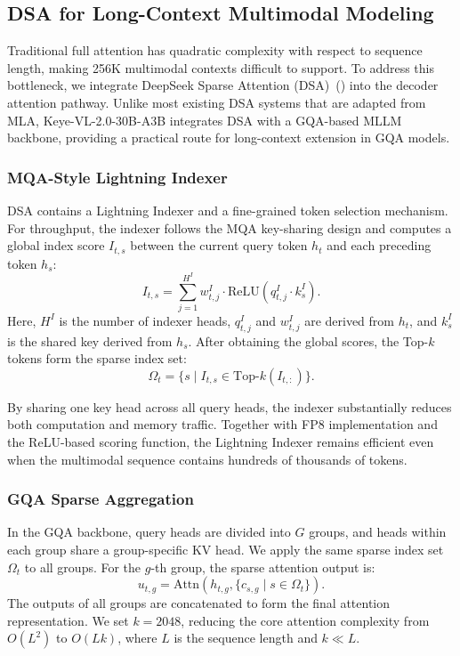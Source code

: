 \documentclass{article} %
\begin{document}
\subsection{DSA for Long-Context Multimodal Modeling}

Traditional full attention has quadratic complexity with respect to sequence length, making 256K multimodal contexts difficult to support. To address this bottleneck, we integrate DeepSeek Sparse Attention (DSA)~(\cite{deepseek2025v32}) into the decoder attention pathway. Unlike most existing DSA systems that are adapted from MLA, Keye-VL-2.0-30B-A3B integrates DSA with a GQA-based MLLM backbone, providing a practical route for long-context extension in GQA models.

\subsubsection{MQA-Style Lightning Indexer}

DSA contains a Lightning Indexer and a fine-grained token selection mechanism. For throughput, the indexer follows the MQA key-sharing design and computes a global index score $I_{t,s}$ between the current query token $h_t$ and each preceding token $h_s$:
\begin{equation}
    I_{t,s} = \sum_{j=1}^{H^{I}} w_{t,j}^{I} \cdot \mathrm{ReLU}(q_{t,j}^{I} \cdot k_{s}^{I}).
\end{equation}
Here, $H^I$ is the number of indexer heads, $q_{t,j}^I$ and $w_{t,j}^I$ are derived from $h_t$, and $k_s^I$ is the shared key derived from $h_s$. After obtaining the global scores, the Top-$k$ tokens form the sparse index set:
\begin{equation}
    \Omega_t = \{s \mid I_{t,s} \in \mathrm{Top}\text{-}k(I_{t,:})\}.
\end{equation}

By sharing one key head across all query heads, the indexer substantially reduces both computation and memory traffic. Together with FP8 implementation and the ReLU-based scoring function, the Lightning Indexer remains efficient even when the multimodal sequence contains hundreds of thousands of tokens.

\subsubsection{GQA Sparse Aggregation}

In the GQA backbone, query heads are divided into $G$ groups, and heads within each group share a group-specific KV head. We apply the same sparse index set $\Omega_t$ to all groups. For the $g$-th group, the sparse attention output is:
\begin{equation}
    u_{t,g} = \mathrm{Attn}(h_{t,g}, \{c_{s,g} \mid s \in \Omega_t\}).
\end{equation}
The outputs of all groups are concatenated to form the final attention representation. We set $k=2048$, reducing the core attention complexity from $O(L^2)$ to $O(Lk)$, where $L$ is the sequence length and $k \ll L$.
\end{document}
